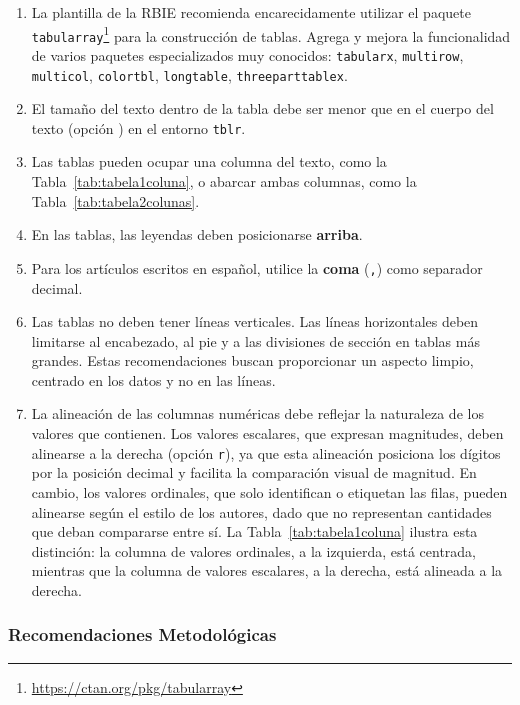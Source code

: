 \documentclass[spanish]{rbie2026}%
\begin{document}
\begin{enumerate}
    \item La plantilla de la RBIE recomienda encarecidamente utilizar el paquete \texttt{tabularray}\footnote{\url{https://ctan.org/pkg/tabularray}} para la construcción de tablas. Agrega y mejora la funcionalidad de varios paquetes especializados muy conocidos: \texttt{tabularx}, \texttt{multirow}, \texttt{multicol}, \texttt{colortbl}, \texttt{longtable}, \texttt{threeparttablex}.

    \item El tamaño del texto dentro de la tabla debe ser menor que en el cuerpo del texto (opción ) en el entorno \texttt{tblr}.

    \item Las tablas pueden ocupar una columna del texto, como la Tabla~\ref{tab:tabela1coluna}, o abarcar ambas columnas, como la Tabla~\ref{tab:tabela2colunas}.

    \item En las tablas, las leyendas deben posicionarse \textbf{arriba}.

    \item Para los artículos escritos en español, utilice la \textbf{coma} (\texttt{,}) como separador decimal.

    \item Las tablas no deben tener líneas verticales. Las líneas horizontales deben limitarse al encabezado, al pie y a las divisiones de sección en tablas más grandes. Estas recomendaciones buscan proporcionar un aspecto limpio, centrado en los datos y no en las líneas.

    \item La alineación de las columnas numéricas debe reflejar la naturaleza de los valores que contienen. Los valores escalares, que expresan magnitudes, deben alinearse a la derecha (opción \texttt{r}), ya que esta alineación posiciona los dígitos por la posición decimal y facilita la comparación visual de magnitud. En cambio, los valores ordinales, que solo identifican o etiquetan las filas, pueden alinearse según el estilo de los autores, dado que no representan cantidades que deban compararse entre sí. La Tabla~\ref{tab:tabela1coluna} ilustra esta distinción: la columna de valores ordinales, a la izquierda, está centrada, mientras que la columna de valores escalares, a la derecha, está alineada a la derecha.
\end{enumerate}

\subsubsection{Recomendaciones Metodológicas}
\end{document}
